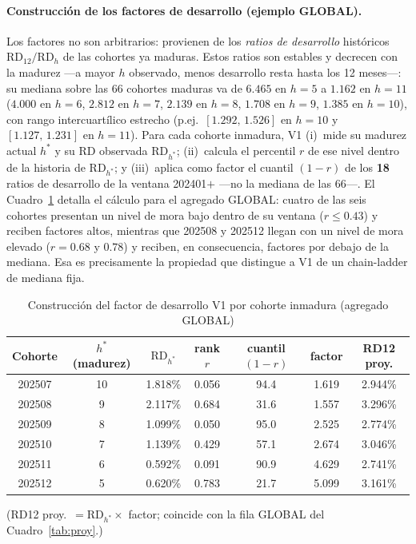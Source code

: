 \documentclass[12pt, a4paper]{article}
\newcommand{\RD}{\ensuremath{\mathrm{RD}}}
\begin{document}
\paragraph{Construcción de los factores de desarrollo (ejemplo GLOBAL).} Los factores no son
arbitrarios: provienen de los \emph{ratios de desarrollo} históricos $\RD_{12}/\RD_{h}$ de las
cohortes ya maduras. Estos ratios son estables y decrecen con la madurez ---a
mayor $h$ observado, menos desarrollo resta hasta los 12 meses---: su mediana sobre las 66 cohortes
maduras va de $6.465$ en $h{=}5$ a $1.162$ en $h{=}11$ ($4.000$ en $h{=}6$, $2.812$ en $h{=}7$,
$2.139$ en $h{=}8$, $1.708$ en $h{=}9$, $1.385$ en $h{=}10$), con rango intercuartílico estrecho
(p.ej.\ $[1.292,\,1.526]$ en $h{=}10$ y $[1.127,\,1.231]$ en $h{=}11$). Para cada cohorte inmadura,
V1 (i)~mide su madurez actual $h^\ast$ y su RD observada $\RD_{h^\ast}$; (ii)~calcula el percentil
$r$ de ese nivel dentro de la historia de $\RD_{h^\ast}$; y (iii)~aplica como factor el cuantil
$(1-r)$ de los \textbf{18} ratios de desarrollo de la ventana 202401$+$ ---no la mediana de las 66---.
El Cuadro~\ref{tab:v1cons} detalla el cálculo para el agregado GLOBAL: cuatro de las seis cohortes
presentan un nivel de mora bajo dentro de su ventana ($r\le0.43$) y reciben factores altos,
mientras que 202508 y 202512 llegan con un nivel de mora elevado ($r=0.68$ y $0.78$) y reciben, en
consecuencia, factores por debajo de la mediana. Esa es precisamente la propiedad que distingue a
V1 de un chain-ladder de mediana fija.

\begin{table}[H]
\centering
\caption{Construcción del factor de desarrollo V1 por cohorte inmadura (agregado GLOBAL)}
\label{tab:v1cons}
\small
\begin{tabular}{ccccccc}
\toprule
\textbf{Cohorte} & \textbf{$h^\ast$ (madurez)} & \textbf{$\RD_{h^\ast}$} & \textbf{rank $r$}
  & \textbf{cuantil $(1{-}r)$} & \textbf{factor} & \textbf{RD12 proy.} \\
\midrule
202507 & 10 & 1.818\% & 0.056 & 94.4 & 1.619 & 2.944\% \\
202508 & 9  & 2.117\% & 0.684 & 31.6 & 1.557 & 3.296\% \\
202509 & 8  & 1.099\% & 0.050 & 95.0 & 2.525 & 2.774\% \\
202510 & 7  & 1.139\% & 0.429 & 57.1 & 2.674 & 3.046\% \\
202511 & 6  & 0.592\% & 0.091 & 90.9 & 4.629 & 2.741\% \\
202512 & 5  & 0.620\% & 0.783 & 21.7 & 5.099 & 3.161\% \\
\bottomrule
\end{tabular}
\end{table}
\noindent (RD12 proy.\ $=\RD_{h^\ast}\times$ factor; coincide con la fila GLOBAL del
Cuadro~\ref{tab:proy}.)
\end{document}
